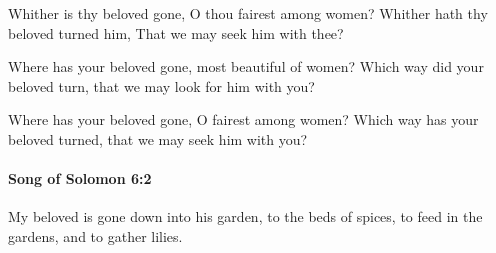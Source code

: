 			\begin{versebox}
					\item[BHS] 
					\item[LXX] 
					\item[ASV] Whither is thy beloved gone, O thou fairest among women? Whither hath thy beloved turned him, That we may seek him with thee?
					\item[NIV] Where has your beloved gone, most beautiful of women? Which way did your beloved turn, that we may look for him with you?
					\item[NRSV] Where has your beloved gone, O fairest among women? Which way has your beloved turned, that we may seek him with you?
			\end{versebox}

		\paragraph{Song of Solomon 6:2} %
			\label{SONGOFSOLOMON-6-2}

			My beloved is gone down into his garden, to the beds of spices, to feed in the gardens, and to gather lilies.

